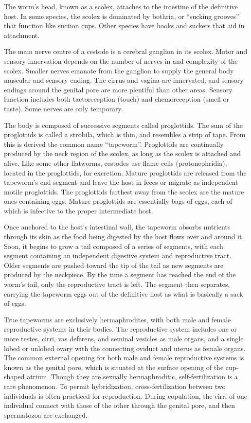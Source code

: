 \documentclass[]{book}
\theoremstyle{definition}
\theoremstyle{definition}
\theoremstyle{definition}
\theoremstyle{remark}
\begin{document}
The worm's head, known as a scolex, attaches to the intestine of the
definitive host. In some species, the scolex is dominated by bothria, or
``sucking grooves'' that function like suction cups. Other species have
hooks and suckers that aid in attachment.

The main nerve centre of a cestode is a cerebral ganglion in its scolex.
Motor and sensory innervation depends on the number of nerves in and
complexity of the scolex. Smaller nerves emanate from the ganglion to
supply the general body muscular and sensory ending. The cirrus and
vagina are innervated, and sensory endings around the genital pore are
more plentiful than other areas. Sensory function includes both
tactoreception (touch) and chemoreception (smell or taste). Some nerves
are only temporary.

The body is composed of successive segments called proglottids. The sum
of the proglottids is called a strobila, which is thin, and resembles a
strip of tape. From this is derived the common name ``tapeworm''.
Proglottids are continually produced by the neck region of the scolex,
as long as the scolex is attached and alive. Like some other flatworms,
cestodes use flame cells (protonephridia), located in the proglottids,
for excretion. Mature proglottids are released from the tapeworm's end
segment and leave the host in feces or migrate as independent motile
proglottids. The proglottids farthest away from the scolex are the
mature ones containing eggs. Mature proglottids are essentially bags of
eggs, each of which is infective to the proper intermediate host.

Once anchored to the host's intestinal wall, the tapeworm absorbs
nutrients through its skin as the food being digested by the host flows
over and around it. Soon, it begins to grow a tail composed of a series
of segments, with each segment containing an independent digestive
system and reproductive tract. Older segments are pushed toward the tip
of the tail as new segments are produced by the neckpiece. By the time a
segment has reached the end of the worm's tail, only the reproductive
tract is left. The segment then separates, carrying the tapeworm eggs
out of the definitive host as what is basically a sack of eggs.

True tapeworms are exclusively hermaphrodites, with both male and female
reproductive systems in their bodies. The reproductive system includes
one or more testes, cirri, vas deferens, and seminal vesicles as male
organs, and a single lobed or unlobed ovary with the connecting oviduct
and uterus as female organs. The common external opening for both male
and female reproductive systems is known as the genital pore, which is
situated at the surface opening of the cup-shaped atrium. Though they
are sexually hermaphroditic, self-fertilization is a rare phenomenon. To
permit hybridization, cross-fertilization between two individuals is
often practiced for reproduction. During copulation, the cirri of one
individual connect with those of the other through the genital pore, and
then spermatozoa are exchanged.
\end{document}
